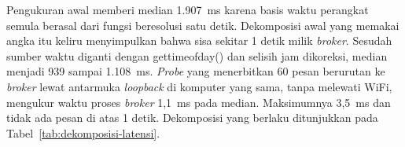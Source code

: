 Pengukuran awal memberi median 1.907~ms karena basis waktu perangkat semula berasal dari fungsi beresolusi satu detik. Dekomposisi awal yang memakai angka itu keliru menyimpulkan bahwa sisa sekitar 1 detik milik \textit{broker}. Sesudah sumber waktu diganti dengan gettimeofday() dan selisih jam dikoreksi, median menjadi 939 sampai 1.108~ms. \textit{Probe} yang menerbitkan 60 pesan berurutan ke \textit{broker} lewat antarmuka \textit{loopback} di komputer yang sama, tanpa melewati WiFi, mengukur waktu proses \textit{broker} 1,1~ms pada median. Maksimumnya 3,5~ms dan tidak ada pesan di atas 1 detik. Dekomposisi yang berlaku ditunjukkan pada Tabel~\ref{tab:dekomposisi-latensi}.


